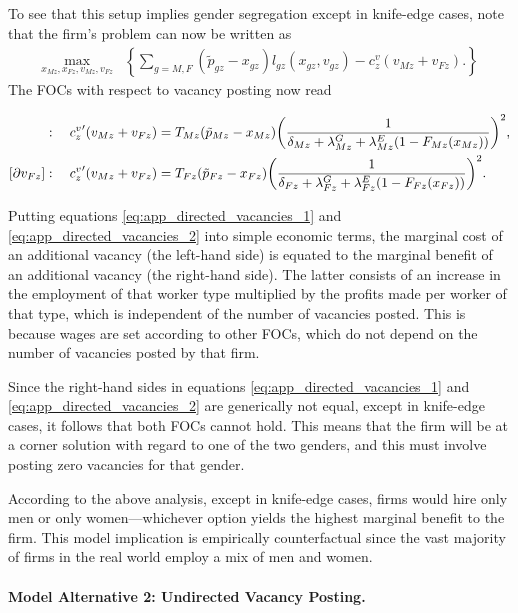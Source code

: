 To see that this setup implies gender segregation except in knife-edge cases, note that the firm's problem can now be written as
%
\begin{align}
    \max_{x_{Mz},x_{Fz},v_{Mz},v_{Fz}} & \left\{ \sum_{g = M,F} (\tilde{p}_{gz} - x_{gz}) l_{gz}(x_{gz},v_{gz}) - c_{z}^{v} (v_{Mz} + v_{Fz}).  \right\}
\end{align}
%
The FOCs with respect to vacancy posting now read
%
\begin{small}
    \begin{align}
        [\partial v_{Mz}]: \quad {c_{z}^{v}}'(v_{Mz} + v_{Fz}) &= T_{Mz} (\tilde{p}_{Mz} - x_{Mz}) \biggl{(} \frac{1}{\delta_{Mz} + \lambda_{Mz}^{G} + \lambda_{Mz}^{E} (1 - F_{Mz}(x_{Mz}))} \biggr{)}^2, \label{eq:app_directed_vacancies_1} \\
        [\partial v_{Fz}]: \quad {c_{z}^{v}}'(v_{Mz} + v_{Fz}) &= T_{Fz} (\tilde{p}_{Fz} - x_{Fz}) \biggl{(} \frac{1}{\delta_{Fz} + \lambda_{Fz}^{G} + \lambda_{Fz}^{E} (1 - F_{Fz}(x_{Fz}))} \biggr{)}^2. \label{eq:app_directed_vacancies_2}
    \end{align}
\end{small}
%
Putting equations \eqref{eq:app_directed_vacancies_1} and \eqref{eq:app_directed_vacancies_2} into simple economic terms, the marginal cost of an additional vacancy (the left-hand side) is equated to the marginal benefit of an additional vacancy (the right-hand side). The latter consists of an increase in the employment of that worker type multiplied by the profits made per worker of that type, which is independent of the number of vacancies posted. This is because wages are set according to other FOCs, which do not depend on the number of vacancies posted by that firm.

Since the right-hand sides in equations \eqref{eq:app_directed_vacancies_1} and \eqref{eq:app_directed_vacancies_2} are generically not equal, except in knife-edge cases, it follows that both FOCs cannot hold. This means that the firm will be at a corner solution with regard to one of the two genders, and this must involve posting zero vacancies for that gender.

According to the above analysis, except in knife-edge cases, firms would hire only men or only women---whichever option yields the highest marginal benefit to the firm. This model implication is empirically counterfactual since the vast majority of firms in the real world employ a mix of men and women.


\paragraph{Model Alternative 2: Undirected Vacancy Posting.}

